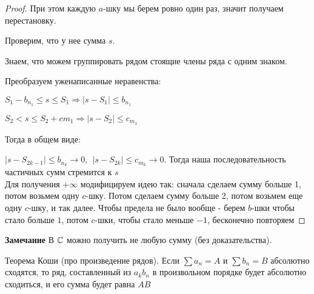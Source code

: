 \begin{proof}
    При этом каждую $a$-шку мы берем ровно один раз, значит получаем перестановку.

    Проверим, что у нее сумма $s$.

    Знаем, что можем группировать рядом стоящие члены ряда с одним знаком.

    Преобразуем уженаписанные неравенства:

    $S_1 - b_{n_1} \leq s \leq S_1 \Rightarrow |s - S_1| \leq b_{n_1}$

    $S_2 < s \leq S_2 + c{m_1} \Rightarrow |s - S_2| \leq c_{m_1}$

    Тогда в общем виде:

    $|s - S_{2k-1}| \leq b_{n_k} \to 0,\ \ |s - S_{2k}| \leq c_{m_k} \to 0$. Тогда
     наша последовательность частичных сумм стремится к $s$\\

    Для получения $+\infty$ модифицируем идею так: сначала сделаем сумму больше 1, потом возьмем одну $c$-шку. Потом сделаем
     сумму больше 2, потом возьмем еще одну $c$-шку, и так далее. Чтобы предела не было вообще - берем $b$-шки чтобы стало больше $1$,
      потом $c$-шки, чтобы стало меньше $-1$, бесконечно повторяем

\end{proof}

\textbf{Замечание} В $\mathbb{C}$ можно получить не любую сумму (без доказательства).

\begin{theorem}
    
    Теорема Коши (про произведение рядов). Если $\sum a_n = A$ и $\sum b_n = B$ абсолютно сходятся, то
    ряд, составленный из $a_kb_n$ в произвольном порядке будет абсолютно сходиться, и его сумма будет равна $AB$
\end{theorem}


